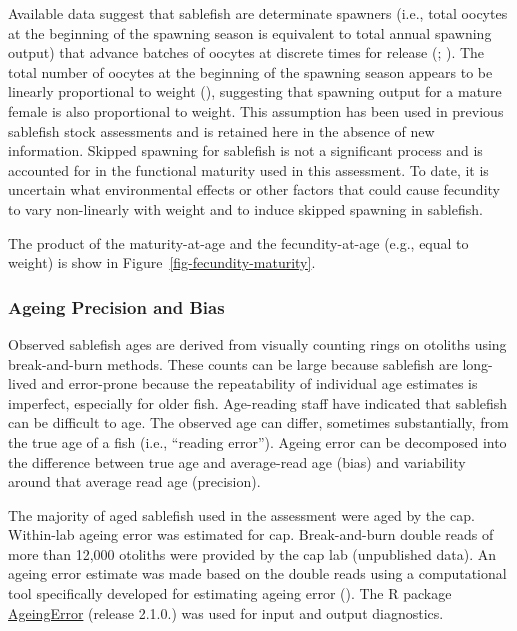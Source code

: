 \documentclass[
  english,
]{article}
\begin{document}
Available data suggest that sablefish are determinate spawners (i.e.,
total oocytes at the beginning of the spawning season is equivalent to
total annual spawning output) that advance batches of oocytes at
discrete times for release (; ). The total
number of oocytes at the beginning of the spawning season appears to be
linearly proportional to weight (), suggesting that spawning output for a mature female is also
proportional to weight. This assumption has been used in previous
sablefish stock assessments and is retained here in the absence of new
information. Skipped spawning for sablefish is not a significant process
and is accounted for in the functional maturity used in this assessment.
To date, it is uncertain what environmental effects or other factors
that could cause fecundity to vary non-linearly with weight and to
induce skipped spawning in sablefish.

The product of the maturity-at-age and the fecundity-at-age (e.g., equal
to weight) is show in Figure~\ref{fig-fecundity-maturity}.

\subsubsection{Ageing Precision and
Bias}\label{ageing-precision-and-bias}

Observed sablefish ages are derived from visually counting rings on
otoliths using break-and-burn methods. These counts can be large because
sablefish are long-lived and error-prone because the repeatability of
individual age estimates is imperfect, especially for older fish.
Age-reading staff have indicated that sablefish can be difficult to age.
The observed age can differ, sometimes substantially, from the true age
of a fish (i.e., ``reading error''). Ageing error can be decomposed into
the difference between true age and average-read age (bias) and
variability around that average read age (precision).

The majority of aged sablefish used in the assessment were aged by the
\gls{cap}. Within-lab ageing error was estimated for \gls{cap}.
Break-and-burn double reads of more than 12,000 otoliths were provided
by the \gls{cap} lab (unpublished data). An ageing error estimate was
made based on the double reads using a computational tool specifically
developed for estimating ageing error
(). The R package
\href{https://pfmc-assessments.github.io/AgeingError/index.html}{AgeingError}
(release 2.1.0.) was used for input and output diagnostics.
\end{document}
